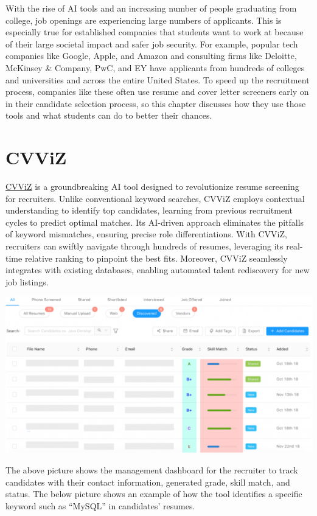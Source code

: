 \documentclass[
]{book}
\begin{document}
With the rise of AI tools and an increasing number of people graduating from college, job openings are experiencing large numbers of applicants. This is especially true for established companies that students want to work at because of their large societal impact and safer job security. For example, popular tech companies like Google, Apple, and Amazon and consulting firms like Deloitte, McKinsey \& Company, PwC, and EY have applicants from hundreds of colleges and universities and across the entire United States. To speed up the recruitment process, companies like these often use resume and cover letter screeners early on in their candidate selection process, so this chapter discusses how they use those tools and what students can do to better their chances.

\hypertarget{cvviz}{%
\section{CVViZ}\label{cvviz}}

\href{https://cvviz.com/product/resume-screening/}{CVViZ} is a groundbreaking AI tool designed to revolutionize resume screening for recruiters. Unlike conventional keyword searches, CVViZ employs contextual understanding to identify top candidates, learning from previous recruitment cycles to predict optimal matches. Its AI-driven approach eliminates the pitfalls of keyword mismatches, ensuring precise role differentiations. With CVViZ, recruiters can swiftly navigate through hundreds of resumes, leveraging its real-time relative ranking to pinpoint the best fits. Moreover, CVViZ seamlessly integrates with existing databases, enabling automated talent rediscovery for new job listings.~

\includegraphics[width=5.44792in,height=\textheight]{cvviz pic 1.png}

The above picture shows the management dashboard for the recruiter to track candidates with their contact information, generated grade, skill match, and status. The below picture shows an example of how the tool identifies a specific keyword such as ``MySQL'' in candidates' resumes.
\end{document}
